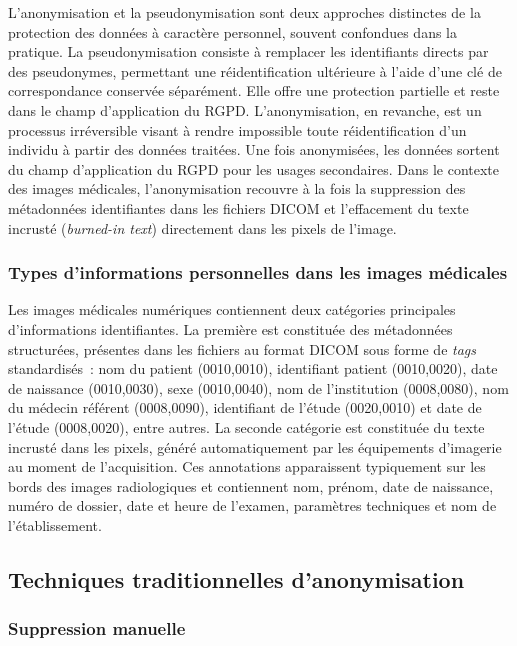 L'anonymisation et la pseudonymisation sont deux approches distinctes de la protection des données à caractère personnel, souvent confondues dans la pratique. La pseudonymisation consiste à remplacer les identifiants directs par des pseudonymes, permettant une réidentification ultérieure à l'aide d'une clé de correspondance conservée séparément. Elle offre une protection partielle et reste dans le champ d'application du RGPD. L'anonymisation, en revanche, est un processus irréversible visant à rendre impossible toute réidentification d'un individu à partir des données traitées. Une fois anonymisées, les données sortent du champ d'application du RGPD pour les usages secondaires. Dans le contexte des images médicales, l'anonymisation recouvre à la fois la suppression des métadonnées identifiantes dans les fichiers DICOM et l'effacement du texte incrusté (\textit{burned-in text}) directement dans les pixels de l'image.

\subsubsection{Types d'informations personnelles dans les images médicales}

Les images médicales numériques contiennent deux catégories principales d'informations identifiantes. La première est constituée des métadonnées structurées, présentes dans les fichiers au format DICOM sous forme de \textit{tags} standardisés~: nom du patient (0010,0010), identifiant patient (0010,0020), date de naissance (0010,0030), sexe (0010,0040), nom de l'institution (0008,0080), nom du médecin référent (0008,0090), identifiant de l'étude (0020,0010) et date de l'étude (0008,0020), entre autres. La seconde catégorie est constituée du texte incrusté dans les pixels, généré automatiquement par les équipements d'imagerie au moment de l'acquisition. Ces annotations apparaissent typiquement sur les bords des images radiologiques et contiennent nom, prénom, date de naissance, numéro de dossier, date et heure de l'examen, paramètres techniques et nom de l'établissement.

\subsection{Techniques traditionnelles d'anonymisation}

\subsubsection{Suppression manuelle}

